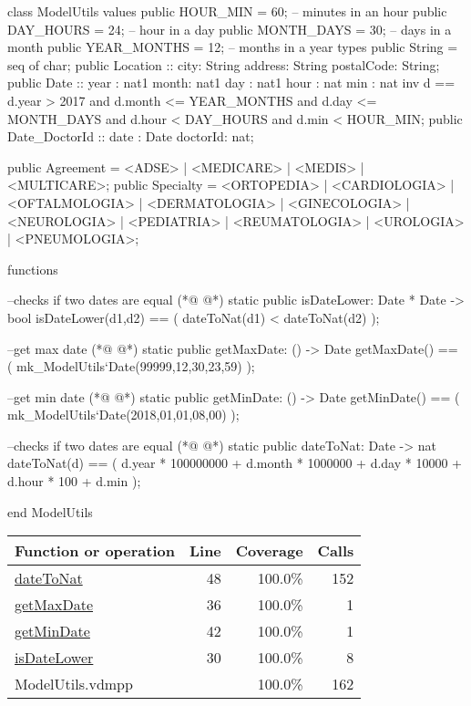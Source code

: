 \begin{vdmpp}[breaklines=true]
class ModelUtils
values
 public HOUR_MIN = 60; -- minutes in an hour
 public DAY_HOURS = 24; -- hour in a day
 public MONTH_DAYS = 30; -- days in a month
 public YEAR_MONTHS = 12; -- months in a year
types
 public String = seq of char;
 public Location :: city: String
           address: String
           postalCode: String;
 public Date :: year : nat1
         month: nat1
         day : nat1
         hour : nat
         min : nat
 inv d == d.year > 2017 and d.month <= YEAR_MONTHS and d.day <= MONTH_DAYS and d.hour < DAY_HOURS and d.min < HOUR_MIN;
 public Date_DoctorId :: date : Date
              doctorId: nat;
        
 public Agreement = <ADSE> | <MEDICARE> | <MEDIS> | <MULTICARE>;
 public Specialty = <ORTOPEDIA> | <CARDIOLOGIA> | <OFTALMOLOGIA> | 
           <DERMATOLOGIA> | <GINECOLOGIA> | <NEUROLOGIA> | 
           <PEDIATRIA> | <REUMATOLOGIA> | <UROLOGIA> |
           <PNEUMOLOGIA>;

functions
 
 --checks if two dates are equal
(*@
\label{isDateLower:30}
@*)
 static public isDateLower: Date * Date -> bool
 isDateLower(d1,d2) == (
  dateToNat(d1) < dateToNat(d2)
 );
 
 --get max date
(*@
\label{getMaxDate:36}
@*)
 static public getMaxDate: () -> Date
 getMaxDate() == (
  mk_ModelUtils`Date(99999,12,30,23,59)
 );
 
 --get min date
(*@
\label{getMinDate:42}
@*)
 static public getMinDate: () -> Date
 getMinDate() == (
  mk_ModelUtils`Date(2018,01,01,08,00)
 );
 
 --checks if two dates are equal
(*@
\label{dateToNat:48}
@*)
 static public dateToNat: Date -> nat
 dateToNat(d) == (
  d.year * 100000000 + 
  d.month * 1000000 + 
  d.day * 10000 + 
  d.hour * 100 + 
  d.min 
 );

end ModelUtils
\end{vdmpp}
\bigskip
\begin{longtable}{|l|r|r|r|}
\hline
Function or operation & Line & Coverage & Calls \\
\hline
\hline
\hyperref[dateToNat:48]{dateToNat} & 48&100.0\% & 152 \\
\hline
\hyperref[getMaxDate:36]{getMaxDate} & 36&100.0\% & 1 \\
\hline
\hyperref[getMinDate:42]{getMinDate} & 42&100.0\% & 1 \\
\hline
\hyperref[isDateLower:30]{isDateLower} & 30&100.0\% & 8 \\
\hline
\hline
ModelUtils.vdmpp & & 100.0\% & 162 \\
\hline
\end{longtable}

